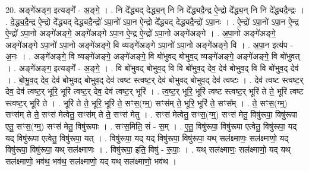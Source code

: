 \documentclass[17pt]{extarticle}
\begin{document}
20. अङ्गे॑अङ्ग॒ इत्यङ्गे᳚ - अ॒ङ्गे॒ । . नि दे᳚द्ध्यद् देद्ध्य॒न् नि नि दे᳚द्ध्यदै॒न्द्र ऐ॒न्द्रो दे᳚द्ध्य॒न् नि नि दे᳚द्ध्यदै॒न्द्रः । . दे॒द्ध्य॒दै॒न्द्र ऐ॒न्द्रो दे᳚द्ध्यद् देद्ध्यदै॒न्द्रो॑ ऽपा॒नो॑ ऽपा॒न ऐ॒न्द्रो दे᳚द्ध्यद् देद्ध्यदै॒न्द्रो॑ ऽपा॒नः । . ऐ॒न्द्रो॑ ऽपा॒नो॑ ऽपा॒न ऐ॒न्द्र ऐ॒न्द्रो॑ ऽपा॒नो अङ्गे॑अङ्गे॒ अङ्गे॑अङ्गे ऽपा॒न ऐ॒न्द्र ऐ॒न्द्रो॑ ऽपा॒नो अङ्गे॑अङ्गे । . अ॒पा॒नो अङ्गे॑अङ्गे॒ अङ्गे॑अङ्गे ऽपा॒नो॑ ऽपा॒नो अङ्गे॑अङ्गे॒ वि व्यङ्गे॑अङ्गे ऽपा॒नो॑ ऽपा॒नो अङ्गे॑अङ्गे॒ वि । . अ॒पा॒न इत्य॑प - अ॒नः । . अङ्गे॑अङ्गे॒ वि व्यङ्गे॑अङ्गे॒ अङ्गे॑अङ्गे॒ वि बो॑भुवद् बोभुव॒द् व्यङ्गे॑अङ्गे॒ अङ्गे॑अङ्गे॒ वि बो॑भुवत् । . अङ्गे॑अङ्ग॒ इत्यङ्गे᳚ - अ॒ङ्गे॒ । . वि बो॑भुवद् बोभुव॒द् वि वि बो॑भुव॒द् देव॒ देव॑ बोभुव॒द् वि वि बो॑भुव॒द् देव॑ । . बो॒भु॒व॒द् देव॒ देव॑ बोभुवद् बोभुव॒द् देव॑ त्वष्ट स्त्वष्ट॒र् देव॑ बोभुवद् बोभुव॒द् देव॑ त्वष्टः । . देव॑ त्वष्ट स्त्वष्ट॒र् देव॒ देव॑ त्वष्ट॒र् भूरि॒ भूरि॑ त्वष्ट॒र् देव॒ देव॑ त्वष्ट॒र् भूरि॑ । . त्व॒ष्ट॒र् भूरि॒ भूरि॑ त्वष्ट स्त्वष्ट॒र् भूरि॑ ते ते॒ भूरि॑ त्वष्ट स्त्वष्ट॒र् भूरि॑ ते । . भूरि॑ ते ते॒ भूरि॒ भूरि॑ ते॒ सꣳस॒(ग्म्॒) सꣳस॑म् ते॒ भूरि॒ भूरि॑ ते॒ सꣳस᳚म् । . ते॒ सꣳस॒(ग्म्॒) सꣳस॑म् ते ते॒ सꣳस॑ मेत्वेतु॒ सꣳस॑म् ते ते॒ सꣳस॑ मेतु । . सꣳस॑ मेत्वेतु॒ सꣳस॒(ग्म्॒) सꣳस॑ मेतु॒ विषु॑रूपा॒ विषु॑रूपा एतु॒ सꣳस॒(ग्म्॒) सꣳस॑ मेतु॒ विषु॑रूपाः । . सꣳस॒मिति॒ सं - स॒म् । . ए॒तु॒ विषु॑रूपा॒ विषु॑रूपा एत्वेतु॒ विषु॑रूपा॒ यद् यद् विषु॑रूपा एत्वेतु॒ विषु॑रूपा॒ यत् । . विषु॑रूपा॒ यद् यद् विषु॑रूपा॒ विषु॑रूपा॒ यथ् सल॑क्ष्माणः॒ सल॑क्ष्माणो॒ यद् विषु॑रूपा॒ विषु॑रूपा॒ यथ् सल॑क्ष्माणः । . विषु॑रूपा॒ इति॒ विषु॑ - रू॒पाः॒ । . यथ् सल॑क्ष्माणः॒ सल॑क्ष्माणो॒ यद् यथ् सल॑क्ष्माणो॒ भव॑थ॒ भव॑थ॒ सल॑क्ष्माणो॒ यद् यथ् सल॑क्ष्माणो॒ भव॑थ । \newline
\end{document}
